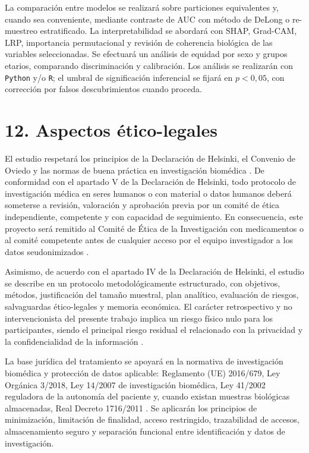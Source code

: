 \documentclass[11pt,a4paper]{article}
\begin{document}
La comparación entre modelos se realizará sobre particiones equivalentes y,
cuando sea conveniente, mediante contraste de AUC con método de DeLong o
re-muestreo estratificado. La interpretabilidad se abordará con SHAP, Grad-CAM,
LRP, importancia permutacional y revisión de coherencia biológica de las
variables seleccionadas. Se efectuará un análisis de equidad por sexo y grupos
etarios, comparando discriminación y calibración. Los análisis se realizarán con
\texttt{Python} y/o \texttt{R}; el umbral de significación inferencial se fijará
en $p<0{,}05$, con corrección por falsos descubrimientos cuando proceda.

\section*{12. Aspectos ético-legales}
El estudio respetará los principios de la Declaración de Helsinki, el Convenio
de Oviedo y las normas de buena práctica en investigación biomédica
\cite{helsinki,oviedo}. De conformidad con el apartado V de la Declaración de
Helsinki, todo protocolo de investigación médica en seres humanos o con material
o datos humanos deberá someterse a revisión, valoración y aprobación previa por
un comité de ética independiente, competente y con capacidad de seguimiento. En
consecuencia, este proyecto será remitido al Comité de Ética de la Investigación
con medicamentos o al comité competente antes de cualquier acceso por el equipo
investigador a los datos seudonimizados \cite{helsinki}.

Asimismo, de acuerdo con el apartado IV de la Declaración de Helsinki, el
estudio se describe en un protocolo metodológicamente estructurado, con
objetivos, métodos, justificación del tamaño muestral, plan analítico,
evaluación de riesgos, salvaguardas ético-legales y memoria económica. El
carácter retrospectivo y no intervencionista del presente trabajo implica un
riesgo físico nulo para los participantes, siendo el principal riesgo residual
el relacionado con la privacidad y la confidencialidad de la información
\cite{helsinki}.

La base jurídica del tratamiento se apoyará en la normativa de investigación
biomédica y protección de datos aplicable: Reglamento (UE) 2016/679, Ley
Orgánica 3/2018, Ley 14/2007 de investigación biomédica, Ley 41/2002 reguladora
de la autonomía del paciente y, cuando existan muestras biológicas almacenadas,
Real Decreto 1716/2011 \cite{rgpd,lopd,lib,autonomia,biobancos}. Se aplicarán
los principios de minimización, limitación de finalidad, acceso restringido,
trazabilidad de accesos, almacenamiento seguro y separación funcional entre
identificación y datos de investigación.
\end{document}

